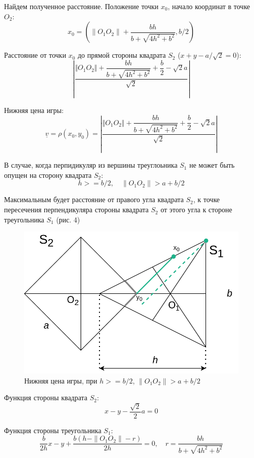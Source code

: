 \documentclass[12pt,a4paper]{article}
\begin{document}
Найдем полученное расстояние. Положение точки $x_0$, начало координат в точке $O_2$:
\[
  x_0 = (\|O_1 O_2\|+\frac{bh}{b+\sqrt{4h^2+b^2}}, b/2)
\]

Расстояние от точки $x_0$ до прямой стороны квадрата $S_2$ ($x + y - a/\sqrt{2}=0$):
\[
  \left\vert
    \frac {
      \Vert O_1 O_2 \Vert +
      \dfrac{bh}{b+\sqrt{4h^2+b^2}} +
      \dfrac{b}{2} -
      \sqrt{2}a
    } {
      \sqrt{2}
    }
  \right\vert
\]

Нижняя цена игры:
\[
  \underline{v} = \rho(x_0, y_0) =
  \left\vert
    \frac {
      \Vert O_1 O_2 \Vert +
      \dfrac{bh}{b+\sqrt{4h^2+b^2}} +
      \dfrac{b}{2} -
      \sqrt{2}a
    } {
      \sqrt{2}
    }
  \right\vert
\]

В случае, когда перпидикуляр из вершины треуглоьника $S_1$ не может быть
опущен на сторону квадрата $S_2$:
\[
  h >= b/2, \quad \| O_1 O_2 \| > a + b/2
\]

Максимальным будет расстояние от правого угла квадрата $S_2$,
к точке пересечения перпендикуляра стороны квадрата $S_2$ от этого угла
к стороне треугольника $S_1$ (рис. 4)

\begin{figure}[ht]
  \centering
  \includegraphics[scale=0.4]{persuit_min_max_3.drawio.png}
  \caption{Нижняя цена игры, при $h >= b/2$, $\| O_1 O_2 \| > a + b/2$}
\end{figure}

Функция стороны квадрата $S_2$:
\[
  x - y - \frac{\sqrt{2}}{2}a = 0
\]

Функция стороны треугольника $S_1$:
\[
  \frac{b}{2h}x - y + \frac{b(h - \|O_1 O_2\|-r)}{2h} = 0, \quad r = \frac{bh}{b+\sqrt{4h^2+b^2}}
\]
\end{document}
